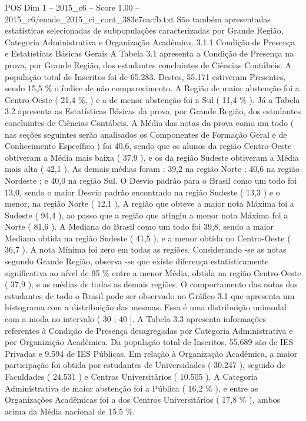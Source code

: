 \begin{textsample}{POS Dim 1 – 2015\_c6 – Score 1.00 – 2015\_c6/enade\_2015\_ci\_cont\_383e7cacfb.txt}
São também apresentadas estatísticas selecionadas de subpopulações caracterizadas por Grande Região, Categoria Administrativa e Organização Acadêmica. 3.1.1 Condição de Presença e Estatísticas Básicas Gerais A Tabela 3.1 apresenta a Condição de Presença na prova, por Grande Região, dos estudantes concluintes de Ciências Contábeis.
A população total de Inscritos foi de 65.283.
Destes, 55.171 estiveram Presentes, sendo 15,5 \% o índice de não comparecimento.
A Região de maior abstenção foi a Centro-Oeste ( 21,4 \%, ) e a de menor abstenção foi a Sul ( 11,4 \% ).
Já a Tabela 3.2 apresenta as Estatísticas Básicas da prova, por Grande Região, dos estudantes concluintes de Ciências Contábeis.
A Média das notas da prova como um todo ( nas seções seguintes serão analisados os Componentes de Formação Geral e de Conhecimento Específico ) foi 40,6, sendo que os alunos da região Centro-Oeste obtiveram a Média mais baixa ( 37,9 ), e os da região Sudeste obtiveram a Média mais alta ( 42,1 ).
As demais médias foram : 39,2 na região Norte ; 40,6 na região Nordeste ; e 40,0 na região Sul.
O Desvio padrão para o Brasil como um todo foi 13,0, sendo o maior Desvio padrão encontrado na região Sudeste ( 13,3 ) e o menor, na região Norte ( 12,1 ), A região que obteve a maior nota Máxima foi a Sudeste ( 94,4 ), ao passo que a região que atingiu a menor nota Máxima foi a Norte ( 81,6 ).
A Mediana do Brasil como um todo foi 39,8, sendo a maior Mediana obtida na região Sudeste ( 41,5 ), e a menor obtida no Centro-Oeste ( 36,7 ).
A nota Mínima foi zero em todas as regiões.
Considerando -se as notas segundo Grande Região, observa -se que existe diferença estatisticamente significativa ao nível de 95 \% entre a menor Média, obtida na região Centro-Oeste ( 37,9 ), e as médias de todas as demais regiões.
O comportamento das notas dos estudantes de todo o Brasil pode ser observado no Gráfico 3.1 que apresenta um histograma com a distribuição das mesmas.
Essa é uma distribuição unimodal com a moda no intervalo ( 30 ; 40 ].
A Tabela 3.3 apresenta informações referentes à Condição de Presença desagregadas por Categoria Administrativa e por Organização Acadêmica.
Da população total de Inscritos, 55.689 são de IES Privadas e 9.594 de IES Públicas.
Em relação à Organização Acadêmica, a maior participação foi obtida por estudantes de Universidades ( 30.247 ), seguido de Faculdades ( 24.531 ) e Centros Universitários ( 10.505 ).
A Categoria Administrativa de maior abstenção foi a Pública ( 16,2 \% ), e entre as Organizações Acadêmicas foi a dos Centros Universitários ( 17,8 \% ), ambos acima da Média nacional de 15,5 \%.

\end{textsample}
